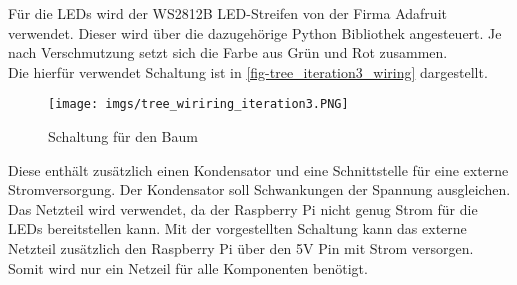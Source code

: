 \documentclass[.../Dokumentation.tex]{subfiles}
\begin{document}
    Für die LEDs wird der WS2812B LED-Streifen von der Firma Adafruit verwendet. Dieser wird über die dazugehörige Python Bibliothek angesteuert. Je nach Verschmutzung setzt sich die Farbe aus Grün und Rot zusammen.\\
    Die hierfür verwendet Schaltung ist in \autoref{fig-tree_iteration3_wiring} dargestellt. 
       	\begin{figure}[H]
    	\begin{center}
    		\texttt{[image: imgs/tree\_wiriring\_iteration3.PNG]}
    		\caption{Schaltung für den Baum}
    		\label{fig-tree_iteration3_wiring}
    	\end{center}
    \end{figure}
    \noindent
   	Diese enthält zusätzlich einen Kondensator und eine Schnittstelle für eine externe Stromversorgung. Der Kondensator soll Schwankungen der Spannung ausgleichen. Das Netzteil wird verwendet, da der Raspberry Pi nicht genug Strom für die LEDs bereitstellen kann. Mit der vorgestellten Schaltung kann das externe Netzteil zusätzlich den Raspberry Pi über den 5V Pin mit Strom versorgen. Somit wird nur ein Netzeil für alle Komponenten  benötigt.
   	
\end{document}

